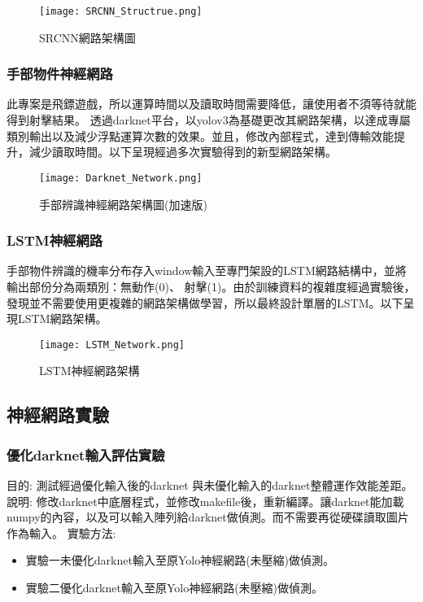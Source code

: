 \begin{figure}[H]
    \centering
    \texttt{[image: SRCNN\_Structrue.png]}
    \caption{SRCNN網路架構圖}
    \label{fig:SRCNN網路架構圖}
\end{figure}
\subsubsection{手部物件神經網路}

此專案是飛鏢遊戲，所以運算時間以及讀取時間需要降低，讓使用者不須等待就能得到射擊結果。
透過darknet平台，以yolov3為基礎更改其網路架構，以達成專屬類別輸出以及減少浮點運算次數的效果。並且，修改內部程式，達到傳輸效能提升，減少讀取時間。以下呈現經過多次實驗得到的新型網路架構。
\begin{figure}[H]
    \centering
    \texttt{[image: Darknet\_Network.png]}
    \caption{手部辨識神經網路架構圖(加速版)}
    \label{fig:手部辨識神經網路架構圖(加速版)}
\end{figure}



\subsubsection{LSTM神經網路}
手部物件辨識的機率分布存入window輸入至專門架設的LSTM網路結構中，並將輸出部份分為兩類別：無動作(0)、 射擊(1)。由於訓練資料的複雜度經過實驗後，發現並不需要使用更複雜的網路架構做學習，所以最終設計單層的LSTM。以下呈現LSTM網路架構。

\begin{figure}[H]
    \centering
    \texttt{[image: LSTM\_Network.png]}
    \caption{LSTM神經網路架構}
    \label{fig:LSTM神經網路架構}
\end{figure}


\subsection{神經網路實驗}

\subsubsection{優化darknet輸入評估實驗}

目的: 測試經過優化輸入後的darknet 與未優化輸入的darknet整體運作效能差距。
說明: 修改darknet中底層程式，並修改makefile後，重新編譯。讓darknet能加載numpy的內容，以及可以輸入陣列給darknet做偵測。而不需要再從硬碟讀取圖片作為輸入。
實驗方法:
\begin{itemize}
\item 實驗一未優化darknet輸入至原Yolo神經網路(未壓縮)做偵測。
\item 實驗二優化darknet輸入至原Yolo神經網路(未壓縮)做偵測。
\end{itemize}

